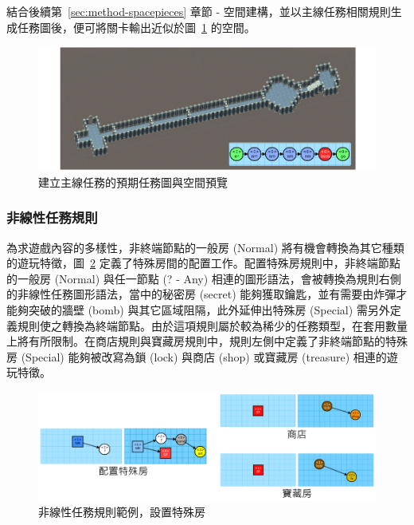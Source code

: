 結合後續第~\ref{sec:method-spacepieces} 章節 - 空間建構，並以主線任務相關規則生成任務圖後，便可將關卡輸出近似於圖~\ref{fig:missiongrammars-rules-linear-preview} 的空間。

\begin{figure}[ht]
  \begin{center}
    \includegraphics[width=1.0\textwidth]{figures/missiongrammars-rules-linear-preview.png}
    \caption{建立主線任務的預期任務圖與空間預覽}
    \label{fig:missiongrammars-rules-linear-preview}
  \end{center}
\end{figure}

\subsubsection{非線性任務規則}
\label{sssec:method-missiongrammars-rules-nonlinearrules}

為求遊戲內容的多樣性，非終端節點的一般房 (Normal) 將有機會轉換為其它種類的遊玩特徵，圖~\ref{fig:missiongrammars-rules-nonlinear-example1} 定義了特殊房間的配置工作。配置特殊房規則中，非終端節點的一般房 (Normal) 與任一節點 (? - Any) 相連的圖形語法，會被轉換為規則右側的非線性任務圖形語法，當中的秘密房 (secret) 能夠獲取鑰匙，並有需要由炸彈才能夠突破的牆壁 (bomb) 與其它區域阻隔，此外延伸出特殊房 (Special) 需另外定義規則使之轉換為終端節點。由於這項規則屬於較為稀少的任務類型，在套用數量上將有所限制。在商店規則與寶藏房規則中，規則左側中定義了非終端節點的特殊房 (Special) 能夠被改寫為鎖 (lock) 與商店 (shop) 或寶藏房 (treasure) 相連的遊玩特徵。

\begin{figure}[ht]
  \begin{center}
    \includegraphics[width=1.0\textwidth]{figures/missiongrammars-rules-nonlinear-example1.png}
    \caption{非線性任務規則範例，設置特殊房}
    \label{fig:missiongrammars-rules-nonlinear-example1}
  \end{center}
\end{figure}

